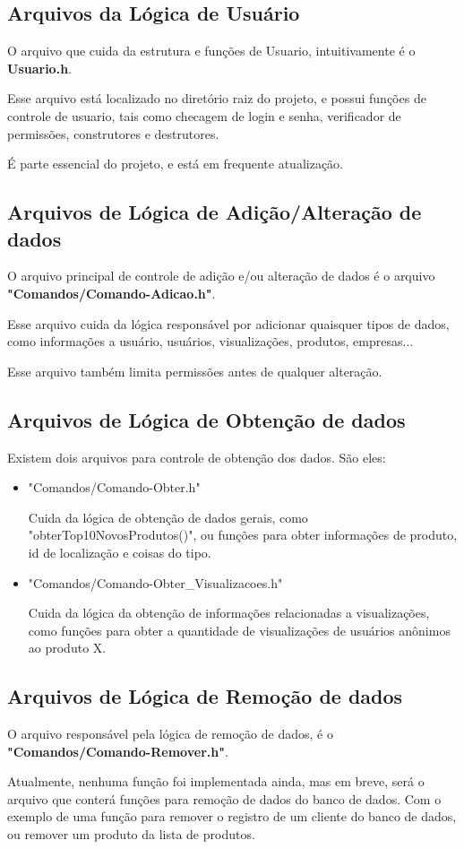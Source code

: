 \documentclass[onecolumn,12pt]{article}
\begin{document}
			\subsection{Arquivos da Lógica de Usuário}
				O arquivo que cuida da estrutura e funções de Usuario, intuitivamente é o \textbf{Usuario.h}.\par
				Esse arquivo está localizado no diretório raiz do projeto, e possui funções de controle de usuario, tais como checagem de login e senha, verificador de permissões, construtores e destrutores.\par
				É parte essencial do projeto, e está em frequente atualização.

			\subsection{Arquivos de Lógica de Adição/Alteração de dados}
				O arquivo principal de controle de adição e/ou alteração de dados é o arquivo \textbf{"Comandos/Comando-Adicao.h"}.\par
				Esse arquivo cuida da lógica responsável por adicionar quaisquer tipos de dados, como informações a usuário, usuários, visualizações, produtos, empresas...\par
				Esse arquivo também limita permissões antes de qualquer alteração.

			\subsection{Arquivos de Lógica de Obtenção de dados}
				Existem dois arquivos para controle de obtenção dos dados. São eles:\par
				\begin{itemize}
					\item{"Comandos/Comando-Obter.h"}\par
						Cuida da lógica de obtenção de dados gerais, como "obterTop10NovosProdutos()", ou funções para obter informações de produto, id de localização e coisas do tipo.
					\item{"Comandos/Comando-Obter\_Visualizacoes.h"}\par
						Cuida da lógica da obtenção de informações relacionadas a visualizações, como funções para obter a quantidade de visualizações de usuários anônimos ao produto X.
				\end{itemize}

			\subsection{Arquivos de Lógica de Remoção de dados}
				O arquivo responsável pela lógica de remoção de dados, é o \textbf{"Comandos/Comando-Remover.h"}.\par
				Atualmente, nenhuma função foi implementada ainda, mas em breve, será o arquivo que conterá funções para remoção de dados do banco de dados. Com o exemplo de uma função para remover o registro de um cliente do banco de dados, ou remover um produto da lista de produtos.
\end{document}

